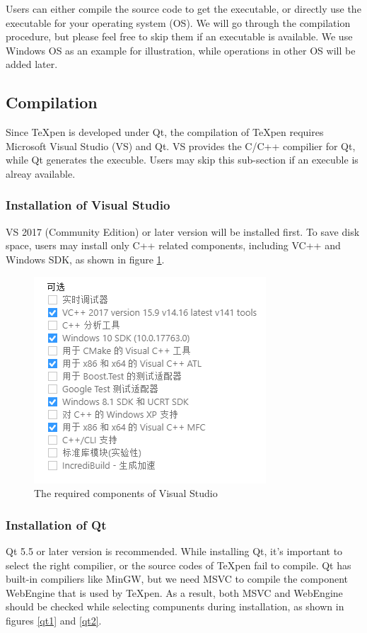 \documentclass[12pt,a4paper]{article}
\begin{document}
Users can either compile the source code to get the executable, or directly use the executable for your operating system (OS). We will go through the compilation procedure, but please feel free to skip them if an executable is available. We use Windows OS as an example for illustration, while operations in other OS will be added later.


\subsection{Compilation}
Since {\TeX}pen is developed under Qt, the compilation of {\TeX}pen requires Microsoft Visual Studio (VS) and Qt. VS provides the C/C++ compilier for Qt, while Qt generates the execuble. Users may skip this sub-section if an execuble is alreay available.

\subsubsection{Installation of Visual Studio}
VS 2017 (Community Edition) or later version will be installed first. To save disk space, users may install only C++ related components, including VC++ and Windows SDK, as shown in figure \ref{vs1}.

\begin{figure}[hbt]
\begin{center}
\includegraphics[scale=0.8]{figs/vs1.png}
\end{center}
\caption{The required components of Visual Studio}
\label{vs1}
\end{figure}

\subsubsection{Installation of Qt}
\label{sec:qt}
Qt 5.5 or later version is recommended. While installing Qt, it's important to select the right compilier, or the source codes of {\TeX}pen fail to compile. Qt has built-in compiliers like MinGW, but we need MSVC to compile the component  WebEngine that is used by {\TeX}pen. As a result, both MSVC and WebEngine should be checked while selecting compunents during installation, as shown in figures \ref{qt1} and \ref{qt2}.
\end{document}
